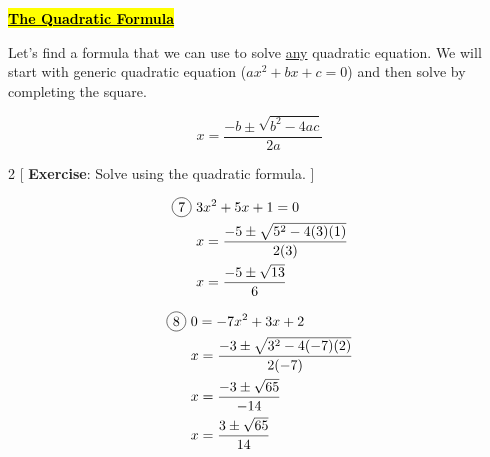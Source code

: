 \centerline{\underline{\textbf{\large \hl{The Quadratic Formula}}}}

\vspace{.4cm}

Let's find a formula that we can use to solve \underline{any} quadratic equation. We will start with generic quadratic equation ($ax^{2}+bx+c=0$) and then solve by completing the square.

\begin{tcolorbox}[colback=red!5!white,colframe=red!75!black]
  \[x=\frac{-b\pm \sqrt{b^{2}-4ac}}{2a}\]
\end{tcolorbox}

\vspace{.5cm}

\begin{multicols}{2}
[
  \textbf{Exercise}: Solve using the quadratic formula.
]

\begin{align*}
  \circled{7}\ &3x^{2}+5x+1=0\\
  &x=\frac{-5\pm\sqrt{5^{2}-4(3)(1)}}{2(3)}\\
  &x=\frac{-5\pm\sqrt{13}}{6}
\end{align*}

\begin{align*}
  \circled{8}\ &0=-7x^{2}+3x+2\\
  &x=\frac{-3\pm\sqrt{3^{2}-4(-7)(2)}}{2(-7)}\\
  &x=\frac{-3\pm\sqrt{65}}{-14}\\
  &x=\frac{3\pm\sqrt{65}}{14}
\end{align*}
\end{multicols}
